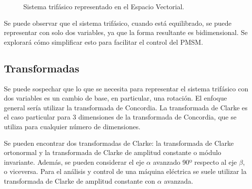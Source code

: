 \begin{figure}[H]
\begin{subfigure}[b]{3cm}
    \end{subfigure}   
    \centering
    \caption{Sistema trifásico representado en el Espacio Vectorial.}
\end{figure}


Se puede observar que el sistema trifásico, cuando está equilibrado, se puede representar con solo dos variables, ya que la forma resultante es bidimensional. Se explorará cómo simplificar esto para facilitar el control del PMSM.

\subsection{Transformadas}

Se puede sospechar que lo que se necesita para representar el sistema trifásico con dos variables es un cambio de base, en particular, una rotación. El enfoque general sería utilizar la transformada de Concordia. La transformada de Clarke es el caso particular para 3 dimensiones de la transformada de Concordia, que se utiliza para cualquier número de dimensiones.

Se pueden encontrar dos transformadas de Clarke: la transformada de Clarke ortonormal y la transformada de Clarke de amplitud constante o módulo invariante. Además, se pueden considerar el eje $\alpha$ avanzado 90º respecto al eje $\beta$, o viceversa. Para el análisis y control de una máquina eléctrica se suele utilizar la transformada de Clarke de amplitud constante con $\alpha$ avanzada.

